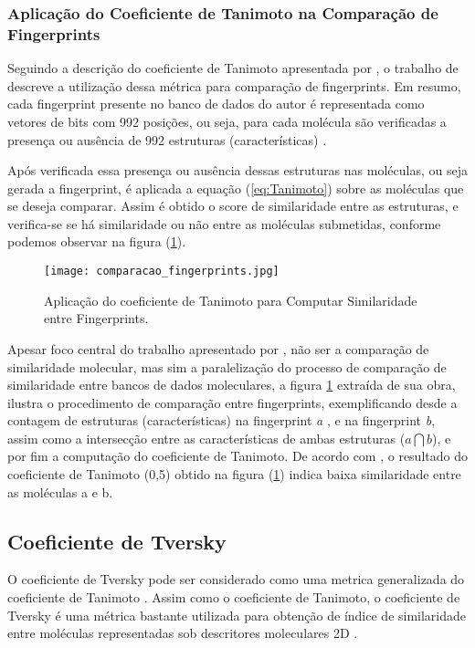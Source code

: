 \subsubsection{Aplicação do Coeficiente de Tanimoto na Comparação de Fingerprints} 

Seguindo a descrição do coeficiente de Tanimoto apresentada por \cite{Dogra2007}, o trabalho de \cite{machao2011gpu} descreve a utilização dessa métrica para comparação de fingerprints. Em resumo, cada fingerprint presente no banco de dados do autor é representada como vetores de bits com 992 posições, ou seja, para cada molécula são 
verificadas a presença ou ausência de 992 estruturas (características) \cite{Dogra2007}. 

Após verificada essa presença ou ausência dessas estruturas nas moléculas, ou seja gerada a 
fingerprint, é aplicada a equação (\ref{eq:Tanimoto}) sobre as moléculas que se deseja comparar. Assim é obtido o score de similaridade entre as estruturas, e verifica-se se há similaridade ou não entre as moléculas submetidas, conforme podemos observar na  figura (\ref{fig:comparafingerprint}).
\begin{figure}[!htb]
	\centering
	\caption[Cálculo do Coeficiente de Tanimoto sobre duas Fingerprints]{Aplicação do coeficiente de Tanimoto para Computar Similaridade entre Fingerprints.}
	\texttt{[image: comparacao\_fingerprints.jpg]} %
	\label{fig:comparafingerprint}
\end{figure}

Apesar foco central do trabalho apresentado por \cite{machao2011gpu}, não ser a comparação de similaridade molecular, mas sim a paralelização do processo de comparação de similaridade entre bancos de dados moleculares, a figura \ref{fig:comparafingerprint} extraída de sua 
obra, ilustra o procedimento de comparação entre fingerprints, exemplificando desde a 
contagem de estruturas (características) na fingerprint \textit{a} , e na fingerprint \textit{b}, assim como a intersecção entre as características de ambas estruturas ($a\bigcap b$), e por fim a computação do coeficiente de Tanimoto. De acordo com \cite{Dogra2007}, o resultado do coeficiente de Tanimoto (0,5) obtido na figura (\ref{fig:comparafingerprint})  indica baixa similaridade entre as moléculas a e b.

\subsection{Coeficiente de Tversky}
O coeficiente de Tversky pode ser considerado como uma metrica generalizada do coeficiente de Tanimoto \cite{swamidass2007bounds}. Assim como o coeficiente de Tanimoto, o coeficiente de Tversky é uma métrica bastante utilizada para obtenção de índice de similaridade entre moléculas representadas sob descritores moleculares 2D \cite{bajorath2004chemoinformatics}.

